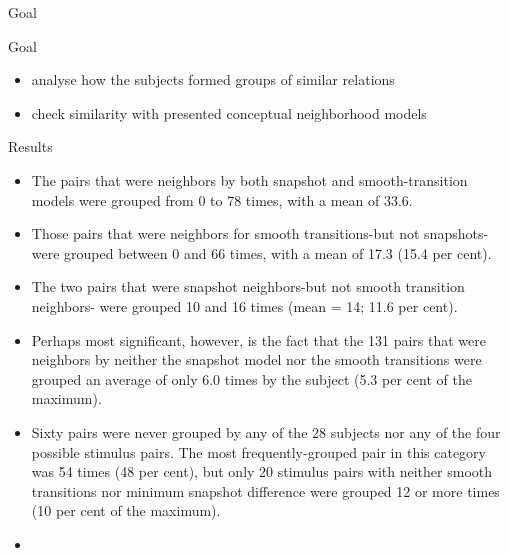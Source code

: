 \begin{frame}{Goal}
	\begin{block}{Goal}
		\begin{itemize}
			\item analyse how the subjects formed groups of similar relations
			\item check similarity with presented conceptual neighborhood models
		\end{itemize}
	\end{block}
\end{frame}


\begin{frame}{Results}
	\begin{itemize}
		\item The pairs that were neighbors by both snapshot and smooth-transition models were grouped from 0 to 78 times, with a mean of 33.6.
		
		\item Those pairs that were neighbors for smooth transitions-but not snapshots- were grouped between 0 and 66 times, with a mean of 17.3 (15.4 per cent).
		
		\item The two pairs that were snapshot neighbors-but not smooth transition neighbors- were grouped 10 and 16 times (mean = 14; 11.6 per cent).
		
		\item Perhaps most significant, however, is the fact that the 131 pairs that were neighbors by neither the snapshot model nor the smooth transitions were grouped an average of only 6.0 times by the subject (5.3 per cent of the maximum).
		
		\item Sixty pairs were never grouped by any of the 28 subjects nor any of the four possible stimulus pairs. The most frequently-grouped pair in this category was 54 times (48 per cent), but only 20 stimulus pairs with neither smooth transitions nor minimum snapshot difference were grouped 12 or more times (10 per cent of the maximum).
		
		\item 
	\end{itemize}
\end{frame}
